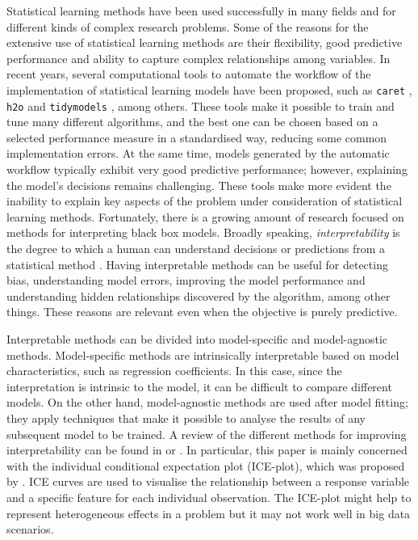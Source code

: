 \documentclass[smallextended,natbib]{svjour3}\usepackage[]{graphicx}\usepackage[]{xcolor}
\begin{document}
Statistical learning methods have been used successfully in many fields and for different kinds of complex research problems. Some of the reasons for the extensive use of statistical learning methods are their flexibility, good predictive performance and ability to capture complex relationships among variables. In recent years, several computational tools to automate the workflow of the implementation of statistical learning models have been proposed, such as \texttt{caret} \citep{caret}, \texttt{h2o} \citep{h2o} and \texttt{tidymodels} \citep{tidymodels}, among others. These tools make it possible to train and tune many different algorithms, and the best one can be chosen based on a selected performance measure in a standardised way, reducing some common implementation errors. At the same time, models generated by the automatic workflow typically exhibit very good predictive performance; however, explaining the model’s decisions remains challenging.
These tools make more evident the inability to explain key aspects of the problem under consideration of statistical learning methods. Fortunately, there is a growing amount of research focused on methods for interpreting black box models. Broadly speaking, \textit{interpretability} is the degree to which a human can understand decisions or predictions from a statistical method \citep{miller2019explanation}. Having interpretable methods can be useful for detecting bias, understanding model errors, improving the model performance and understanding hidden relationships discovered by the algorithm, among other things. These reasons are relevant even when the objective is purely predictive. 

Interpretable methods can be divided into model-specific and model-agnostic methods. Model-specific methods are intrinsically interpretable based on model characteristics, such as regression coefficients. In this case, since the interpretation is intrinsic to the model, it can be difficult to compare different models. On the other hand, model-agnostic methods are used after model fitting; they apply techniques that make it possible to analyse the results of any subsequent model to be trained. A review of the different methods for improving interpretability can be found in \cite{molnar2020} or \cite{maksymiuk2020landscape}.  
In particular, this paper is mainly concerned with the individual conditional expectation plot (ICE-plot), which was proposed by \cite{goldstein2015peeking}. ICE curves are used to visualise the relationship between a response variable and a specific feature for each individual observation. The ICE-plot might help to represent heterogeneous effects in a problem but it may not work well in big data scenarios.  
\end{document}
